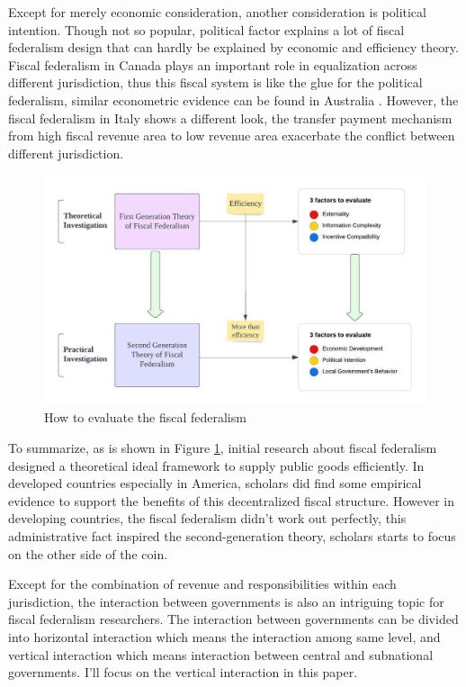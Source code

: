Except for merely economic consideration, another consideration is political intention. Though not so popular, political factor explains a lot of fiscal federalism design that can hardly be explained by economic and efficiency theory. Fiscal federalism in Canada plays an important role in equalization across different jurisdiction, thus this fiscal system is like the glue for the political federalism, similar econometric evidence can be found in Australia  \cite{oates2005toward}. However, the fiscal federalism in Italy shows a different look, the transfer payment mechanism from high fiscal revenue area to low revenue area exacerbate the conflict between different jurisdiction.

\begin{figure}[htb]
  \centering
  \includegraphics[scale=1]{Chapter-2/Figures/how to evaluate the fiscal federalism.jpeg}
  \caption[How to evaluate the fiscal federalism]{How to evaluate the fiscal federalism
  \texttt{} }
  \label{Figure 2.1}
\end{figure}


To summarize, as is shown in Figure \ref*{Figure 2.1}, initial research about fiscal federalism designed a theoretical ideal framework to supply public goods efficiently. In developed countries especially in America, scholars did find some empirical evidence to support the benefits of this decentralized fiscal structure. However in developing countries, the fiscal federalism didn't work out perfectly, this administrative fact inspired the second-generation theory, scholars starts to focus on the other side of the coin. 

Except for the combination of revenue and responsibilities within each jurisdiction, the interaction between governments is also an intriguing topic for fiscal federalism researchers. The interaction between governments can be divided into horizontal interaction which means the interaction among same level, and vertical interaction which means interaction between central and subnational governments. I'll focus on the vertical interaction in this paper.

